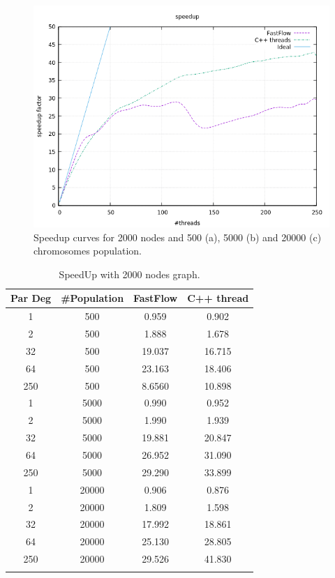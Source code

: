 \documentclass[a4paper,10pt]{article}
\begin{document}
\begin{figure}[H]
		\begin{minipage}[t]{0.32\linewidth}
			\includegraphics[width=\linewidth]{BenchMarkTSP/speedup/2000/SU200020000_zoom.png}
			\subcaption{}
		\end{minipage}
		\caption{Speedup curves for 2000 nodes and 500 (a), 5000 (b) and 20000 (c) chromosomes population.}
		\label{2000}
	\end{figure}

\begin{center}
	\small\addtolength{\tabcolsep}{5pt}
	\centering
	\begin{longtable}{|c|c|c|c|}
		\hline
		\textbf{Par Deg} & \textbf{\#Population} & \textbf{FastFlow} & \textbf{C++ thread}  \\ \hline
		1         &  500     & 0.959 &  0.902   \\ \hline
		2         &  500     & 1.888 &  1.678   \\ \hline
		32       &  500     & 19.037 &  16.715   \\ \hline
		64       &  500     & 23.163 &  18.406   \\ \hline
		250     &  500     & 8.6560 &  10.898   \\ \hline
		1         &  5000   & 0.990 &  0.952   \\ \hline
		2         &  5000   & 1.990 &  1.939   \\ \hline
		32       &  5000   & 19.881 &  20.847   \\ \hline
		64       &  5000   & 26.952 &  31.090   \\ \hline
		250     &  5000   & 29.290 &  33.899   \\ \hline
		1         &  20000 & 0.906 &  0.876   \\ \hline
		2         &  20000 & 1.809 &  1.598   \\ \hline
		32       &  20000 & 17.992 &  18.861   \\ \hline
		64       &  20000 & 25.130 &  28.805   \\ \hline
		250     &  20000 & 29.526 &  41.830   \\ \hline				
		\caption{SpeedUp with 2000 nodes graph.}	
		\label{tab:dati2000}
	\end{longtable}	
\end{center}
\end{document}
